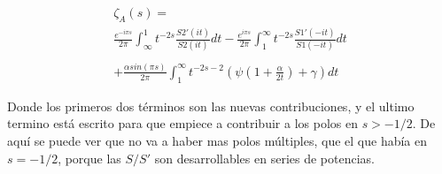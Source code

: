 \begin{equation}
\begin{array}{c}
 \zeta _A (s) = \\
\frac{e ^{- i \pi s}}{2 \pi}
\int _{\infty} ^{1} t ^{-2s } 
		\frac{S2' (it)}{S2 (it)}
		d t
	- 
\frac{e ^{i \pi s}}{2 \pi}
\int _{1} ^{\infty} t ^{-2s } 
	\frac{S1' (-it)}{S1(-it)}
	d t
	 \\ \\
	+ \frac{\alpha sin( \pi s)}{2 \pi }	 \int _1 ^{\infty}
	t ^{-2s-2} \left( \psi \left( 1 + \frac{\alpha}{2 t}\right) + \gamma \right) dt


\end{array}
\end{equation}

\begin{comment}
\begin{equation}
\frac{1 }{2 \pi i}
\int _{circulo} \lambda ^{-2s } \partial \lambda \ Log \left[
					\frac{e ^{\frac{i \alpha Log( 2 \lambda L )}{2 \lambda}} e ^{2 i \lambda L} S1}
					{\Gamma \left( 1 - \frac{i \alpha}{2 \lambda} \right)} - 
					\frac{e ^{\frac{-i \alpha Log(2 \lambda L )}{2 \lambda}} S2}
					{\Gamma \left( 1 + \frac{i \alpha}{2 \lambda} \right)}					
					\right] d \lambda
\end{equation}
\end{comment}

Donde los primeros dos términos son las nuevas contribuciones, y el ultimo termino está escrito para que empiece a contribuir a los polos en  $s > -1/2$. De aquí se puede ver que no va a haber mas polos múltiples, que el que había en $s=-1/2$, porque las $S / S' $ son desarrollables en series de potencias.


